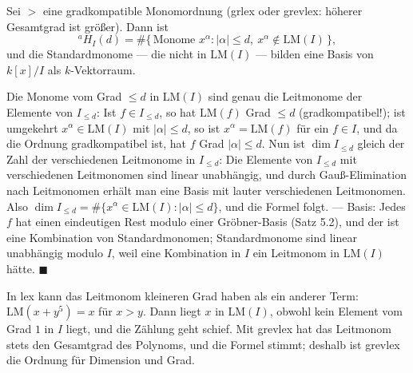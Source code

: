\begin{merksatz}
Sei $>$ eine gradkompatible Monomordnung (grlex oder grevlex: höherer Gesamtgrad ist größer). Dann ist
\[ {}^{a}\!H_I(d) = \#\{\,\text{Monome } x^{\alpha} : |\alpha|\le d,\ x^{\alpha}\notin\mathrm{LM}(I)\,\} , \]
und die Standardmonome --- die nicht in $\mathrm{LM}(I)$ --- bilden eine Basis von $k[x]/I$ als $k$-Vektorraum.

Die Monome vom Grad $\le d$ in $\mathrm{LM}(I)$ sind genau die Leitmonome der Elemente von $I_{\le d}$: Ist $f\in I_{\le d}$, so hat $\mathrm{LM}(f)$ Grad $\le d$ (gradkompatibel!); ist umgekehrt $x^{\alpha}\in\mathrm{LM}(I)$ mit $|\alpha|\le d$, so ist $x^{\alpha} = \mathrm{LM}(f)$ für ein $f\in I$, und da die Ordnung gradkompatibel ist, hat $f$ Grad $|\alpha|\le d$. Nun ist $\dim I_{\le d}$ gleich der Zahl der verschiedenen Leitmonome in $I_{\le d}$: Die Elemente von $I_{\le d}$ mit verschiedenen Leitmonomen sind linear unabhängig, und durch Gauß-Elimination nach Leitmonomen erhält man eine Basis mit lauter verschiedenen Leitmonomen. Also $\dim I_{\le d} = \#\{x^{\alpha}\in\mathrm{LM}(I) : |\alpha|\le d\}$, und die Formel folgt. --- Basis: Jedes $f$ hat einen eindeutigen Rest modulo einer Gröbner-Basis (Satz 5.2), und der ist eine Kombination von Standardmonomen; Standardmonome sind linear unabhängig modulo $I$, weil eine Kombination in $I$ ein Leitmonom in $\mathrm{LM}(I)$ hätte. $\blacksquare$

In lex kann das Leitmonom kleineren Grad haben als ein anderer Term: $\mathrm{LM}(x + y^{5}) = x$ für $x > y$. Dann liegt $x$ in $\mathrm{LM}(I)$, obwohl kein Element vom Grad $1$ in $I$ liegt, und die Zählung geht schief. Mit grevlex hat das Leitmonom stets den Gesamtgrad des Polynoms, und die Formel stimmt; deshalb ist grevlex die Ordnung für Dimension und Grad.

\begin{center}
\begin{minipage}{0.88\textwidth}
\end{minipage}
\end{center}
\end{merksatz}

